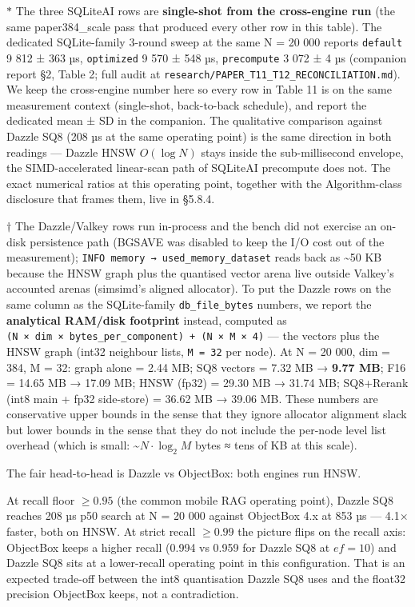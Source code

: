 \(*\) The three SQLiteAI rows are \textbf{single-shot from the cross-engine run}
(the same paper384\_scale pass that produced every other row in this table). The
dedicated SQLite-family 3-round sweep at the same N = 20 000 reports
\texttt{default} 9 812 ± 363 µs, \texttt{optimized} 9 570 ± 548 µs,
\texttt{precompute} 3 072 ± 4 µs (companion report §2, Table 2; full audit at
\texttt{research/PAPER\_T11\_T12\_RECONCILIATION.md}). We keep the cross-engine
number here so every row in Table 11 is on the same measurement context
(single-shot, back-to-back schedule), and report the dedicated mean ± SD in the
companion. The qualitative comparison against Dazzle SQ8 (208 µs at the same
operating point) is the same direction in both readings --- Dazzle HNSW
\(O(\log N)\) stays inside the sub-millisecond envelope, the SIMD-accelerated
linear-scan path of SQLiteAI precompute does not. The exact numerical ratios at
this operating point, together with the Algorithm-class disclosure that frames
them, live in §5.8.4.

\(\dagger\) The Dazzle/Valkey rows run in-process and the bench did not exercise
an on-disk persistence path (BGSAVE was disabled to keep the I/O cost out of the
measurement); \texttt{INFO\ memory\ →\ used\_memory\_dataset} reads back as
\textasciitilde50 KB because the HNSW graph plus the quantised vector arena live
outside Valkey's accounted arenas (simsimd's aligned allocator). To put the
Dazzle rows on the same column as the SQLite-family \texttt{db\_file\_bytes}
numbers, we report the \textbf{analytical RAM/disk footprint} instead, computed
as \texttt{(N\ ×\ dim\ ×\ bytes\_per\_component)\ +\ (N\ ×\ M\ ×\ 4)} --- the
vectors plus the HNSW graph (int32 neighbour lists, \texttt{M\ =\ 32} per node).
At N = 20 000, dim = 384, M = 32: graph alone = 2.44 MB; SQ8 vectors = 7.32 MB →
\textbf{9.77 MB}; F16 = 14.65 MB → 17.09 MB; HNSW (fp32) = 29.30 MB → 31.74 MB;
SQ8+Rerank (int8 main + fp32 side-store) = 36.62 MB → 39.06 MB. These numbers
are conservative upper bounds in the sense that they ignore allocator alignment
slack but lower bounds in the sense that they do not include the per-node level
list overhead (which is small: \textasciitilde{}\(N \cdot \log_2 M\) bytes ≈
tens of KB at this scale).

The fair head-to-head is Dazzle vs ObjectBox: both engines run HNSW.

At recall floor \(\geq 0.95\) (the common mobile RAG operating point), Dazzle
SQ8 reaches 208 µs p50 search at N = 20 000 against ObjectBox 4.x at 853 µs ---
4.1× faster, both on HNSW. At strict recall \(\geq 0.99\) the picture flips on
the recall axis: ObjectBox keeps a higher recall (0.994 vs 0.959 for Dazzle SQ8
at \(ef = 10\)) and Dazzle SQ8 sits at a lower-recall operating point in this
configuration. That is an expected trade-off between the int8 quantisation
Dazzle SQ8 uses and the float32 precision ObjectBox keeps, not a contradiction.


